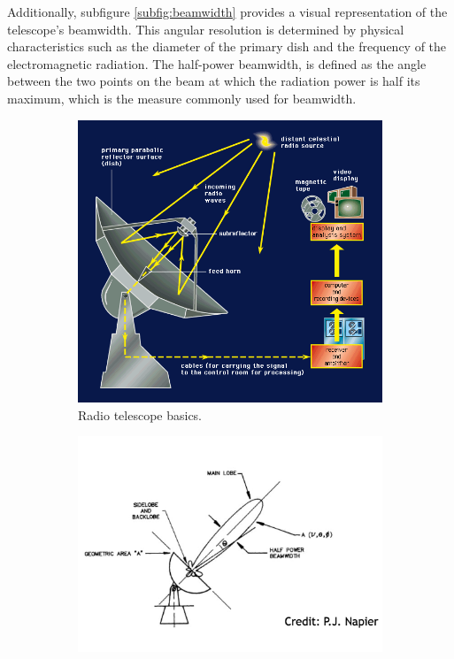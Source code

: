 Additionally, subfigure \ref{subfig:beamwidth} provides a visual representation of the telescope's beamwidth.
This angular resolution is determined by physical characteristics such as the diameter of the primary dish and the frequency of the electromagnetic radiation.
The half-power beamwidth, is defined as the angle between the two points on the beam at which the radiation power is half its maximum, which is the measure commonly used for beamwidth.

\begin{figure}[H]
    \centering
    \begin{subfigure}[t]{0.49\textwidth}
        \centering
        \includegraphics[width=\textwidth]{Astronomy/radio_telescope.png}
        \caption{Radio telescope basics.}
        \label{subfig:radio_telescope}
    \end{subfigure}
    \hfill
    \begin{subfigure}[t]{0.49\textwidth}
       \centering
       \includegraphics[width=\textwidth]{Astronomy/beamwidth_sketch_cropped.png}

\end{subfigure}
\end{figure}
